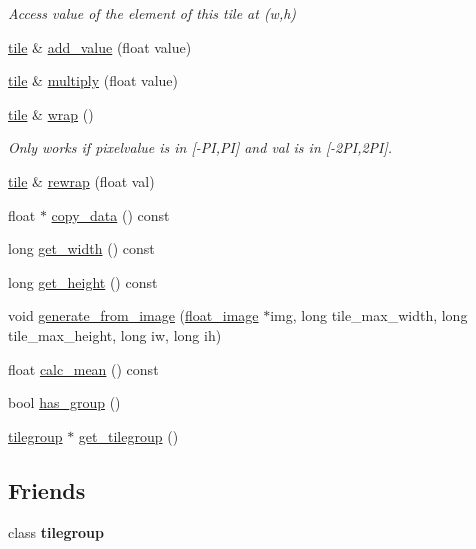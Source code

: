 \begin{DoxyCompactItemize}
\begin{DoxyCompactList}\small\item\em Access value of the element of this tile at (w,h) \end{DoxyCompactList}\item 
\hyperlink{classtile}{tile} \& \hyperlink{classtile_a044a719e0369d7b03ee81bdaf917ce96}{add\-\_\-value} (float value)
\item 
\hyperlink{classtile}{tile} \& \hyperlink{classtile_aa061c1fdcce1723f641355e9a884d329}{multiply} (float value)
\item 
\hyperlink{classtile}{tile} \& \hyperlink{classtile_a0e331de98d713a293c2d09524ceb2abb}{wrap} ()
\begin{DoxyCompactList}\small\item\em Only works if pixelvalue is in \mbox{[}-\/\-P\-I,P\-I\mbox{]} and val is in \mbox{[}-\/2\-P\-I,2\-P\-I\mbox{]}. \end{DoxyCompactList}\item 
\hyperlink{classtile}{tile} \& \hyperlink{classtile_a04907d189cf875a5749d751a8af1c7a9}{rewrap} (float val)
\item 
float $\ast$ \hyperlink{classtile_ab3b683d2fea9c14a8fb5fc6fb02cc14d}{copy\-\_\-data} () const 
\item 
long \hyperlink{classtile_ab17cd2ca85fb73ee40612f543dea083c}{get\-\_\-width} () const 
\item 
long \hyperlink{classtile_aa7077bc22ada6ea7e524d9d8e44431a1}{get\-\_\-height} () const 
\item 
void \hyperlink{classtile_a5f50600c8e541aa5ae85340d67fa9313}{generate\-\_\-from\-\_\-image} (\hyperlink{classfloat__image}{float\-\_\-image} $\ast$img, long tile\-\_\-max\-\_\-width, long tile\-\_\-max\-\_\-height, long iw, long ih)
\item 
float \hyperlink{classtile_a7a510ae32ed8f009d45adcc3714f2639}{calc\-\_\-mean} () const 
\item 
bool \hyperlink{classtile_a2c793b844fbbf58ab99fa1be5bdce744}{has\-\_\-group} ()
\item 
\hyperlink{classtilegroup}{tilegroup} $\ast$ \hyperlink{classtile_a11a5f9f4ccd3999489d284e1af38c192}{get\-\_\-tilegroup} ()
\end{DoxyCompactItemize}
\subsection*{Friends}
\begin{DoxyCompactItemize}
\item 
\hypertarget{classtile_a2fa7ac0b19bb84e1e68b73be2631ac2f}{class {\bfseries tilegroup}}\label{classtile_a2fa7ac0b19bb84e1e68b73be2631ac2f}

\end{DoxyCompactItemize}


